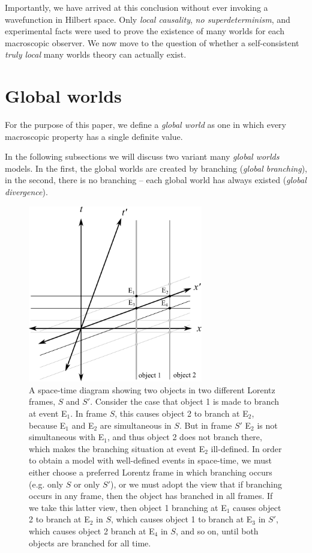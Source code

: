\documentclass[12pt]{article}
\begin{document}
Importantly, we have arrived at this conclusion without ever invoking a wavefunction in Hilbert space.  Only \textit{local causality}, \textit{no superdeterminism}, and experimental facts were used to prove the existence of many worlds for each macroscopic observer.  We now move to the question of whether a self-consistent \textit{truly local} many worlds theory can actually exist.

\section{Global worlds} \label{Global}

For the purpose of this paper, we define a \textit{global world} as one in which every macroscopic property has a single definite value.

In the following subsections we will discuss two variant many \textit{global worlds} models. In the first, the global worlds are created by branching (\textit{global branching}), in the second, there is no branching -- each global world has always existed (\textit{global divergence}).

\begin{figure}[pt]
    \centering
    \includegraphics[width=3in]{Branching.pdf}
    \caption{A space-time diagram showing two objects in two different Lorentz frames, $S$ and $S'$.  Consider the case that object 1 is made to branch at event E$_1$.  In frame $S$, this causes object 2 to branch at E$_2$, because E$_1$ and E$_2$ are simultaneous in $S$. But in frame $S'$ E$_2$ is not simultaneous with E$_1$, and thus object 2 does not branch there, which makes the branching situation at event E$_2$ ill-defined. In order to obtain a model with well-defined events in space-time, we must either choose a preferred Lorentz frame in which branching occurs (e.g. only $S$ or only $S'$), or we must adopt the view that if branching occurs in any frame, then the object has branched in all frames.  If we take this latter view, then object 1 branching at E$_1$ causes object 2 to branch at E$_2$ in $S$, which causes object 1 to branch at E$_3$ in $S'$, which causes object 2 branch at E$_4$ in $S$, and so on, until both objects are branched for all time.}
    \label{fig:branching}
\end{figure}
\end{document}

